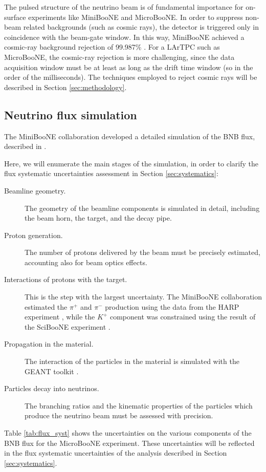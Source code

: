 The pulsed structure of the neutrino beam is of fundamental importance for on-surface experiments like MiniBooNE and MicroBooNE. In order to suppress non-beam related backgrounds (such as cosmic rays), the detector is triggered only in coincidence with the beam-gate window. In this way, MiniBooNE achieved a cosmic-ray background rejection of 99.987\% \cite{AguilarArevalo:2008qa}. For a LArTPC such as MicroBooNE, the cosmic-ray rejection is more challenging, since the data acquisition window must be at least as long as the drift time window (so in the order of the milliseconds). The techniques employed to reject cosmic rays will be described in Section \ref{sec:methodology}.
 
\subsection{Neutrino flux simulation}\label{sec:flux}
The MiniBooNE collaboration developed a detailed simulation of the BNB flux, described in \cite{AguilarArevalo:2008yp}. 

Here, we will enumerate the main stages of the simulation, in order to clarify the flux systematic uncertainties assessment in Section \ref{sec:systematics}:
\begin{description}
\item[Beamline geometry.] The geometry of the beamline components is simulated in detail, including the beam horn, the target, and the decay pipe. 
\item[Proton generation.] The number of protons delivered by the beam must be precisely estimated, accounting also for beam optics effects.
\item[Interactions of protons with the target.] This is the step with the largest uncertainty. The MiniBooNE collaboration estimated the $\pi^+$ and $\pi^-$ production using the data from the HARP experiment \cite{Catanesi:2005rc}, while the $K^+$ component was constrained using the result of the SciBooNE experiment \cite{Cheng:2011wq}. 
\item[Propagation in the material.] The interaction of the particles in the material is simulated with the GEANT toolkit \cite{Brun:1994aa}.
\item[Particles decay into neutrinos.] The branching ratios and the kinematic properties of the particles which produce the neutrino beam must be assessed with precision.
\end{description}

Table \ref{tab:flux_syst} shows the uncertainties on the various components of the BNB flux for the MicroBooNE experiment. These uncertainties will be reflected in the flux systematic uncertainties of the analysis described in Section \ref{sec:systematics}.

